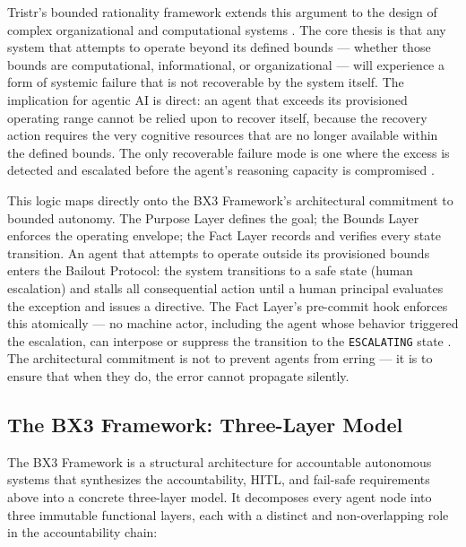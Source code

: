 Tristr's bounded rationality framework extends this argument to the design of complex organizational and computational systems \cite{tristr81}. The core thesis is that any system that attempts to operate beyond its defined bounds --- whether those bounds are computational, informational, or organizational --- will experience a form of systemic failure that is not recoverable by the system itself. The implication for agentic AI is direct: an agent that exceeds its provisioned operating range cannot be relied upon to recover itself, because the recovery action requires the very cognitive resources that are no longer available within the defined bounds. The only recoverable failure mode is one where the excess is detected and escalated before the agent's reasoning capacity is compromised \cite{tristr81}.

This logic maps directly onto the BX3 Framework's architectural commitment to bounded autonomy. The Purpose Layer defines the goal; the Bounds Layer enforces the operating envelope; the Fact Layer records and verifies every state transition. An agent that attempts to operate outside its provisioned bounds enters the Bailout Protocol: the system transitions to a safe state (human escalation) and stalls all consequential action until a human principal evaluates the exception and issues a directive. The Fact Layer's pre-commit hook enforces this atomically --- no machine actor, including the agent whose behavior triggered the escalation, can interpose or suppress the transition to the \texttt{ESCALATING} state \cite{bx3framework2026}. The architectural commitment is not to prevent agents from erring --- it is to ensure that when they do, the error cannot propagate silently.


\subsection{The BX3 Framework: Three-Layer Model}

The BX3 Framework is a structural architecture for accountable autonomous systems that synthesizes the accountability, HITL, and fail-safe requirements above into a concrete three-layer model. It decomposes every agent node into three immutable functional layers, each with a distinct and non-overlapping role in the accountability chain:

